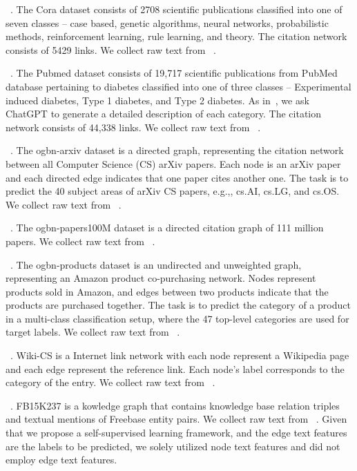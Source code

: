 ~\cite{he2023harnessing}. The Cora dataset consists of 2708 scientific publications classified into one of seven classes – case based, genetic algorithms, neural networks, probabilistic methods, reinforcement learning, rule learning, and theory. The citation network consists of 5429 links. We collect raw text from ~\cite{he2023harnessing}.

~\cite{he2023harnessing}. The Pubmed dataset consists of 19,717 scientific publications from PubMed database pertaining to diabetes classified into one of three classes – Experimental induced diabetes, Type 1 diabetes, and Type 2 diabetes. 
As in~\cite{liu2023one}, we ask ChatGPT to generate a detailed description of each category. The citation network consists of 44,338 links. We collect raw text from ~\cite{he2023harnessing}.

~\cite{hu2020open}. The ogbn-arxiv dataset is a directed graph, representing the citation network between all Computer Science (CS) arXiv papers. Each node is an arXiv paper and each directed edge indicates that one paper cites another one. The task is to predict the 40 subject areas of arXiv CS papers, e.g.,, cs.AI, cs.LG, and cs.OS. We collect raw text from ~\cite{hu2020open}.

~\cite{hu2020open}. The ogbn-papers100M dataset is a directed citation graph of 111 million papers. We collect raw text from ~\cite{hu2020open}.

~\cite{hu2020open}. The ogbn-products dataset is an undirected and unweighted graph, representing an Amazon product co-purchasing network. Nodes represent products sold in Amazon, and edges between two products indicate that the products are purchased together. The task is to predict the category of a product in a multi-class classification setup, where the 47 top-level categories are used for target labels. We collect raw text from ~\cite{hu2020open}.

~\cite{liu2023one}. Wiki-CS is a Internet link network with each node represent a Wikipedia page and each edge represent the reference link. Each node’s label corresponds to the category of the entry. We collect raw text from ~\cite{liu2023one}.

~\cite{liu2023one}. FB15K237 is a kowledge graph that contains knowledge base relation triples and textual mentions of Freebase entity pairs. We collect raw text from ~\cite{liu2023one}. Given that we propose a self-supervised learning framework, and the edge text features are the labels to be predicted, we solely utilized node text features and did not employ edge text features.

